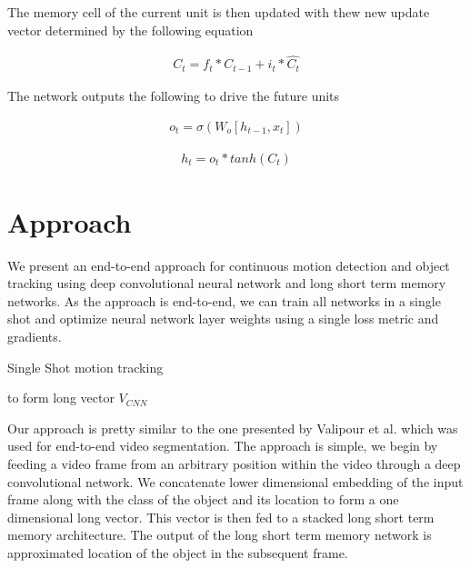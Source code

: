 \documentclass[sigconf]{acmart}
\begin{document}
The memory cell of the current unit is then updated with thew new update vector determined by the following equation

\begin{align} \label{eqn18}
C_t = f_t * C_{t-1} + i_t * \hat{C_t}
\end{align}

The network outputs the following to drive the future units


\begin{align} \label{eqn19}
o_t = \sigma (W_o [h_{t-1},x_t])
\end{align}

\begin{align} \label{eqn20}
h_t = o_t * tanh(C_t)
\end{align}


\section{Approach} \label{approach}

We present an end-to-end approach for continuous motion detection and object tracking using deep convolutional neural network and long short term memory networks. As the approach is end-to-end, we can train all networks in a single shot and optimize neural network layer weights using a single loss metric and gradients. 

\begin{algorithm}

\caption{Single Shot motion tracking}\label{SSDLSTM}

\begin{algorithmic}[1] 
 to form long vector $V_{CNN}$
\EndProcedure
{}
\end{algorithmic}

\end{algorithm}

Our approach is pretty similar to the one presented by Valipour et al. \cite{ DBLP:journals/corr/ValipourSJR16} which was used for end-to-end video segmentation. The approach is simple, we begin by feeding a video frame from an arbitrary position within the video through a deep convolutional network.  We concatenate lower dimensional embedding of the input frame along with the class of the object and its location to form a one dimensional long vector. This vector is then fed to a stacked long short term memory architecture. The output of the long short term memory network is approximated location of the object in the subsequent frame. 
\end{document}
